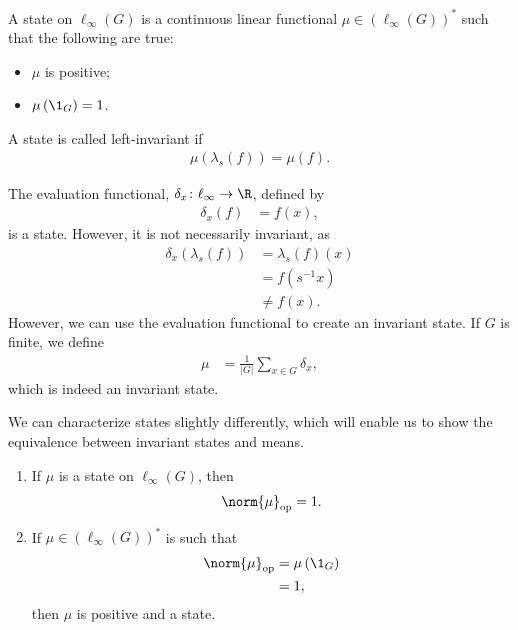 \begin{definition}
  A {state} on $\ell_{\infty}\left(G\right)$ is a continuous linear functional $\mu\in \left(\ell_{\infty}\left(G\right)\right)^{\ast}$ such that the following are true:
  \begin{itemize}
    \item $\mu$ is positive;
    \item $\mu\left(\1_{G}\right) = 1$.
  \end{itemize}
  A state is called left-invariant if
  \begin{align*}
    \mu\left(\lambda_s\left(f\right)\right) = \mu\left(f\right).
  \end{align*}
\end{definition}
\begin{example}
  The evaluation functional, $\delta_x\colon \ell_{\infty}\rightarrow \R$, defined by
  \begin{align*}
    \delta_{x}\left(f\right) &= f(x),
  \end{align*}
  is a state. However, it is not necessarily invariant, as
  \begin{align*}
    \delta_x\left(\lambda_s\left(f\right)\right) &= \lambda_s\left(f\right)\left(x\right)\\
                                                 &= f\left(s^{-1}x\right)\\
                                                 &\neq f(x).
  \end{align*}
  However, we can use the evaluation functional to create an invariant state. If $G$ is finite, we define
  \begin{align*}
    \mu &= \frac{1}{\left\vert G \right\vert} \sum_{x\in G}\delta_x,
  \end{align*}
  which is indeed an invariant state.
\end{example}
We can characterize states slightly differently, which will enable us to show the equivalence between invariant states and means.
\begin{lemma}\label{lemma:characterizing_states}\hfill
  \begin{enumerate}[(1)]
    \item If $\mu$ is a state on $\ell_{\infty}\left(G\right)$, then
      \begin{align*}
        \norm{\mu}_{\op} = 1.
      \end{align*}
    \item If $\mu\in \left(\ell_{\infty}\left(G\right)\right)^{\ast}$ is such that
      \begin{align*}
        \norm{\mu}_{\op} &= \mu\left(\1_{G}\right)\\
                               &= 1,
      \end{align*}
      then $\mu$ is positive and a state.
  \end{enumerate}
\end{lemma}
